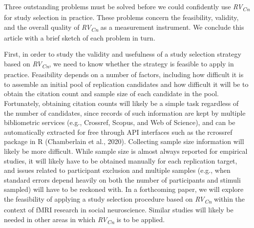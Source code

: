 \documentclass[
  english,
  man,floatsintext]{apa6}
\begin{document}
Three outstanding problems must be solved before we could confidently use \emph{RV\textsubscript{Cn}} for study selection in practice. These problems concern the feasibility, validity, and the overall quality of \emph{RV\textsubscript{Cn}} as a measurement instrument. We conclude this article with a brief sketch of each problem in turn.

First, in order to study the validity and usefulness of a study selection strategy based on \emph{RV\textsubscript{Cn}}, we need to know whether the strategy is feasible to apply in practice. Feasibility depends on a number of factors, including how difficult it is to assemble an initial pool of replication candidates and how difficult it will be to obtain the citation count and sample size of each candidate in the pool. Fortunately, obtaining citation counts will likely be a simple task regardless of the number of candidates, since records of such information are kept by multiple bibliometric services (e.g., Crossref, Scopus, and Web of Science), and can be automatically extracted for free through API interfaces such as the rcrossref package in R (Chamberlain et al., 2020). Collecting sample size information will likely be more difficult. While sample size is almost always reported for empirical studies, it will likely have to be obtained manually for each replication target, and issues related to participant exclusion and multiple samples (e.g., when standard errors depend heavily on both the number of participants and stimuli sampled) will have to be reckoned with. In a forthcoming paper, we will explore the feasibility of applying a study selection procedure based on \emph{RV\textsubscript{Cn}} within the context of fMRI research in social neuroscience. Similar studies will likely be needed in other areas in which \emph{RV\textsubscript{Cn}} is to be applied.
\end{document}
